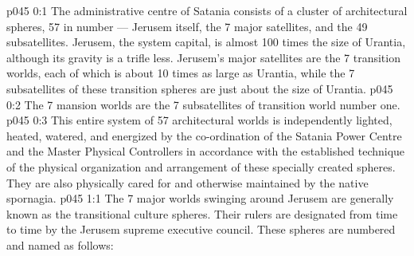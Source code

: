 \author{Melchizedek}
\vs p045 0:1 The administrative centre of Satania consists of a cluster of architectural spheres, 57 in number --- Jerusem itself, the 7 major satellites, and the 49 subsatellites. Jerusem, the system capital, is almost 100 times the size of Urantia, although its gravity is a trifle less. Jerusem’s major satellites are the 7 transition worlds, each of which is about 10 times as large as Urantia, while the 7 subsatellites of these transition spheres are just about the size of Urantia.
\vs p045 0:2 The 7 mansion worlds are the 7 subsatellites of transition world number one.
\vs p045 0:3 This entire system of 57 architectural worlds is independently lighted, heated, watered, and energized by the co\hyp{}ordination of the Satania Power Centre and the Master Physical Controllers in accordance with the established technique of the physical organization and arrangement of these specially created spheres. They are also physically cared for and otherwise maintained by the native spornagia.
\vs p045 1:1 The 7 major worlds swinging around Jerusem are generally known as the transitional culture spheres. Their rulers are designated from time to time by the Jerusem supreme executive council. These spheres are numbered and named as follows:
